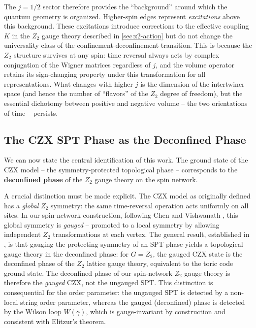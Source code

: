 \documentclass[preprint]{SciPost}
\theoremstyle{plain} %
\begin{document}
The $ j = 1/2 $ sector therefore provides the ``background'' around which the quantum geometry is organized. Higher-spin edges represent \emph{excitations} above this background. These excitations introduce corrections to the effective coupling $ K $ in the $ Z_2 $ gauge theory described in \autoref{sec:z2-action} but do not change the universality class of the confinement-deconfinement transition. This is because the $ Z_2 $ structure survives at any spin: time reversal always acts by complex conjugation of the Wigner matrices regardless of $ j $, and the volume operator retains its sign-changing property under this transformation for all representations. What changes with higher $ j $ is the dimension of the intertwiner space (and hence the number of ``flavors'' of the $ Z_2 $ degree of freedom), but the essential dichotomy between positive and negative volume -- the two orientations of time -- persists.

\subsection{The CZX SPT Phase as the Deconfined Phase}\label{subsec:spt-deconfined}

We can now state the central identification of this work. The ground state of the CZX model -- the symmetry-protected topological phase -- corresponds to the \textbf{deconfined phase} of the $ Z_2 $ gauge theory on the spin network.

A crucial distinction must be made explicit. The CZX model as originally defined \cite{Chen2011Symmetry,Chen2010Local} has a \emph{global} $ Z_2 $ symmetry: the same time-reversal operation acts uniformly on all sites. In our spin-network construction, following Chen and Vishwanath \cite{Chen2015Gauging}, this global symmetry is \emph{gauged} -- promoted to a local symmetry by allowing independent $ Z_2 $ transformations at each vertex. The general result, established in \cite{Levin2012Braiding,Haegeman2015Gauging}, is that gauging the protecting symmetry of an SPT phase yields a topological gauge theory in the deconfined phase: for $ G = Z_2 $, the gauged CZX state is the deconfined phase of the $ Z_2 $ lattice gauge theory, equivalent to the toric code ground state. The deconfined phase of our spin-network $ Z_2 $ gauge theory is therefore the \emph{gauged} CZX, not the ungauged SPT. This distinction is consequential for the order parameter: the ungauged SPT is detected by a non-local string order parameter, whereas the gauged (deconfined) phase is detected by the Wilson loop $ W(\gamma) $, which is gauge-invariant by construction and consistent with Elitzur's theorem.
\end{document}
